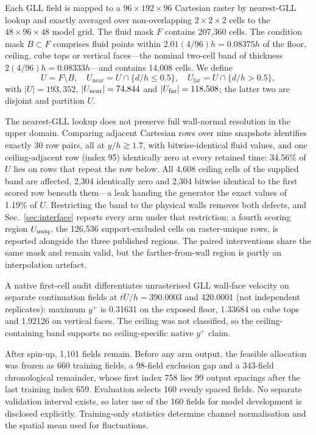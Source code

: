 Each GLL field is mapped to a $96\times192\times96$ Cartesian raster by nearest-GLL lookup and
exactly averaged over non-overlapping $2\times2\times2$ cells to the $48\times96\times48$ model
grid. The fluid mask $F$ contains 207,360 cells. The condition mask $B\subset F$ comprises fluid
points within $2.01(4/96)h=0.08375h$ of the floor, ceiling, cube tops or vertical faces---the
nominal two-cell band of thickness $2(4/96)h=0.08333h$---and contains 14,008 cells. We define
\begin{equation}
 U=F\setminus B,\quad
 U_{\mathrm{near}}=U\cap\{d/h\leq0.5\},\quad
 U_{\mathrm{far}}=U\cap\{d/h>0.5\},
\end{equation}
with $|U|=193{,}352$, $|U_{\rm near}|=74{,}844$ and $|U_{\rm far}|=118{,}508$; the latter two are
disjoint and partition $U$.

The nearest-GLL lookup does not preserve full wall-normal resolution in the upper domain.
Comparing adjacent Cartesian rows over nine snapshots identifies exactly 30 row pairs, all at
$y/h\gtrsim1.7$, with bitwise-identical fluid values, and one ceiling-adjacent row (index 95)
identically zero at every retained time: 34.56\% of $U$ lies on rows that repeat the row below.
All 4,608 ceiling cells of the supplied band are affected, 2,304 identically zero and 2,304
bitwise identical to the first scored row beneath them---a leak handing the generator the exact
values of 1.19\% of $U$.
Restricting the band to the physical walls removes both defects, and
Sec.~\ref{sec:interface} reports every arm under that restriction; a fourth scoring region
$U_{\rm uniq}$, the 126,536 support-excluded cells on raster-unique rows, is reported alongside
the three published regions. The paired interventions share the same mask and remain valid, but
the farther-from-wall region is partly an interpolation artefact.

A native first-cell audit differentiates unrasterised GLL wall-face velocity on separate
continuation fields at $t\overline U/h=390.0003$ and 420.0001 (not independent replicates):
maximum $y^+$ is 0.31631 on the exposed floor, 1.33684 on cube tops and 1.92126 on vertical
faces. The ceiling was not classified, so the ceiling-containing band supports no
ceiling-specific native $y^+$ claim.

After spin-up, 1,101 fields remain. Before any arm output, the feasible allocation was frozen as
660 training fields, a 98-field exclusion gap and a 343-field chronological remainder, whose
first index 758 lies 99 output spacings after the last training index 659. Evaluation selects 160
evenly spaced fields. No separate validation interval exists, so later use of the 160 fields for
model development is disclosed explicitly. Training-only statistics determine channel
normalisation and the spatial mean used for fluctuations.

